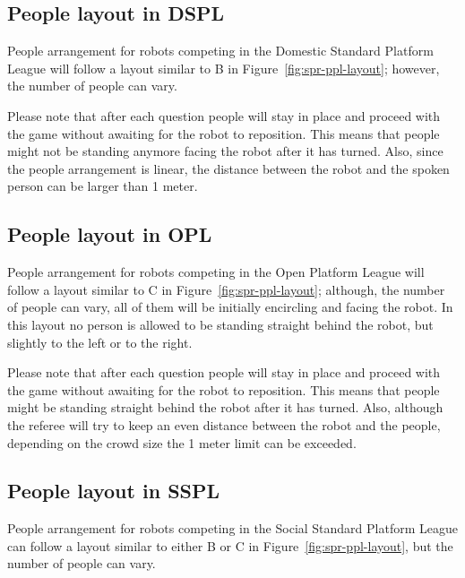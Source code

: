 
\subsection{People layout in DSPL}
People arrangement for robots competing in the Domestic Standard Platform League will follow a layout similar to B in Figure~\ref{fig:spr-ppl-layout}; however, the number of people can vary.

Please note that after each question people will stay in place and proceed with the game without awaiting for the robot to reposition. This means that people might not be standing anymore facing the robot after it has turned. Also, since the people arrangement is linear, the distance between the robot and the spoken person can be larger than 1 meter.

\subsection{People layout in OPL}
People arrangement for robots competing in the Open Platform League will follow a layout similar to C in Figure~\ref{fig:spr-ppl-layout}; although, the number of people can vary, all of them will be initially encircling and facing the robot. In this layout no person is allowed to be standing straight behind the robot, but slightly to the left or to the right.

Please note that after each question people will stay in place and proceed with the game without awaiting for the robot to reposition. This means that people might be standing straight behind the robot after it has turned. Also, although the referee will try to keep an even distance between the robot and the people, depending on the crowd size the 1 meter limit can be exceeded.

\subsection{People layout in SSPL}
People arrangement for robots competing in the Social Standard Platform League can follow a layout similar to either B or C in Figure~\ref{fig:spr-ppl-layout}, but the number of people can vary.


